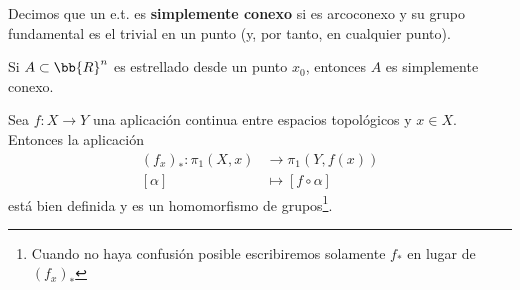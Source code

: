 \begin{definicion}
    Decimos que un e.t. es \textbf{simplemente conexo} si es arcoconexo y su grupo fundamental es el trivial en un punto (y, por tanto, en cualquier punto).
\end{definicion}

\begin{ejemplo}
    Si $A\subset \bb{R}^n$ es estrellado desde un punto $x_0$, entonces $A$ es simplemente conexo.
\end{ejemplo}

\begin{lema}
    Sea $f:X\to Y$ una aplicación continua entre espacios topológicos y $x\in X$. Entonces la aplicación
    \begin{align*}
        (f_x)_* : \pi_1(X,x) &\to \pi_1(Y,f(x))\\
        [\alpha] &\mapsto [f\circ \alpha]
    \end{align*}
    está bien definida y es un homomorfismo de grupos\footnote{Cuando no haya confusión posible escribiremos solamente $f_*$ en lugar de $(f_x)_*$}.


\end{lema}

